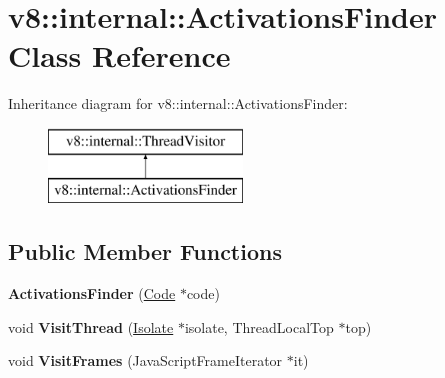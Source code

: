 \hypertarget{classv8_1_1internal_1_1_activations_finder}{}\section{v8\+:\+:internal\+:\+:Activations\+Finder Class Reference}
\label{classv8_1_1internal_1_1_activations_finder}
Inheritance diagram for v8\+:\+:internal\+:\+:Activations\+Finder\+:\begin{figure}[H]
\begin{center}
\leavevmode
\includegraphics[height=2.000000cm]{classv8_1_1internal_1_1_activations_finder}
\end{center}
\end{figure}
\subsection*{Public Member Functions}
\begin{DoxyCompactItemize}
\item 
{\bfseries Activations\+Finder} (\hyperlink{classv8_1_1internal_1_1_code}{Code} $\ast$code)\hypertarget{classv8_1_1internal_1_1_activations_finder_a60e1f2fc90f683fe1e4d5f1a190dde8f}{}\label{classv8_1_1internal_1_1_activations_finder_a60e1f2fc90f683fe1e4d5f1a190dde8f}

\item 
void {\bfseries Visit\+Thread} (\hyperlink{classv8_1_1internal_1_1_isolate}{Isolate} $\ast$isolate, Thread\+Local\+Top $\ast$top)\hypertarget{classv8_1_1internal_1_1_activations_finder_a7eadc771094bec59bd76f6e5ff713a2c}{}\label{classv8_1_1internal_1_1_activations_finder_a7eadc771094bec59bd76f6e5ff713a2c}

\item 
void {\bfseries Visit\+Frames} (Java\+Script\+Frame\+Iterator $\ast$it)\hypertarget{classv8_1_1internal_1_1_activations_finder_a421dbf4202e15a9c29ed94354ea57a8c}{}\label{classv8_1_1internal_1_1_activations_finder_a421dbf4202e15a9c29ed94354ea57a8c}

\end{DoxyCompactItemize}
